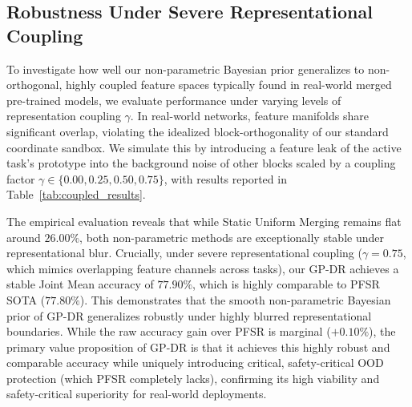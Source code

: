 \subsection{Robustness Under Severe Representational Coupling}
\label{sec:coupled_experiments}
To investigate how well our non-parametric Bayesian prior generalizes to non-orthogonal, highly coupled feature spaces typically found in real-world merged pre-trained models, we evaluate performance under varying levels of representation coupling $\gamma$. In real-world networks, feature manifolds share significant overlap, violating the idealized block-orthogonality of our standard coordinate sandbox. We simulate this by introducing a feature leak of the active task's prototype into the background noise of other blocks scaled by a coupling factor $\gamma \in \{0.00, 0.25, 0.50, 0.75\}$, with results reported in Table~\ref{tab:coupled_results}.

\begin{table}[h]
\caption{Model Joint Mean accuracy (\%) under varying representation coupling levels $\gamma$.}
\label{tab:coupled_results}
\vskip 0.15in
\begin{center}
\begin{small}
\begin{sc}
\end{sc}
\end{small}
\end{center}
\vskip -0.1in
\end{table}

The empirical evaluation reveals that while Static Uniform Merging remains flat around $26.00\%$, both non-parametric methods are exceptionally stable under representational blur. Crucially, under severe representational coupling ($\gamma = 0.75$, which mimics overlapping feature channels across tasks), our GP-DR achieves a stable Joint Mean accuracy of \textbf{$77.90\%$}, which is highly comparable to PFSR SOTA (\textbf{$77.80\%$}). This demonstrates that the smooth non-parametric Bayesian prior of GP-DR generalizes robustly under highly blurred representational boundaries. While the raw accuracy gain over PFSR is marginal ($+0.10\%$), the primary value proposition of GP-DR is that it achieves this highly robust and comparable accuracy while uniquely introducing critical, safety-critical OOD protection (which PFSR completely lacks), confirming its high viability and safety-critical superiority for real-world deployments.

